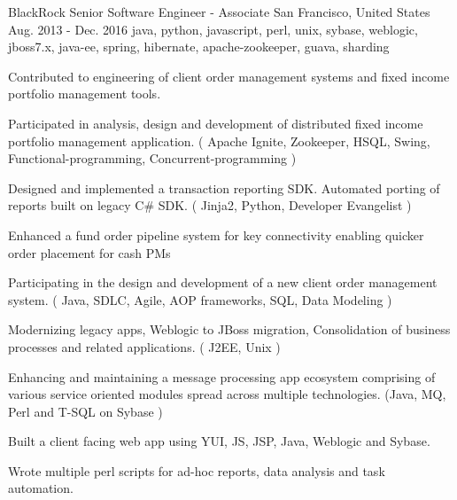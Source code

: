 \cventry
    {BlackRock} %
    {Senior Software Engineer - Associate} %
    {San Francisco, United States} %
    {Aug. 2013 - Dec. 2016} %
    {java, python, javascript, perl, unix, sybase, weblogic, jboss7.x, java-ee, spring, hibernate, apache-zookeeper, guava, sharding}%
    {
        Contributed to engineering of client order management systems and fixed income portfolio management tools.
    \begin{cvitems} %
        \item { Participated in analysis, design and development of distributed fixed income portfolio management application. ( Apache Ignite, Zookeeper, HSQL, Swing, Functional-programming, Concurrent-programming )}
        \item { Designed and implemented a transaction reporting SDK. Automated porting of reports built on legacy C\# SDK. ( Jinja2, Python, Developer Evangelist )}
        \item { Enhanced a fund order pipeline system for key connectivity enabling quicker order placement for cash PMs}
        \item { Participating in the design and development of a new client order management system. ( Java, SDLC, Agile, AOP frameworks, SQL, Data Modeling )}
        \item { Modernizing legacy apps, Weblogic to JBoss migration, Consolidation of business processes and related applications. ( J2EE, Unix )}
        \item { Enhancing and maintaining a message processing app ecosystem comprising of various service oriented modules spread across multiple technologies. (Java, MQ, Perl and T-SQL on Sybase )}
        \item { Built a client facing web app using YUI, JS, JSP, Java, Weblogic and Sybase.}
        \item { Wrote multiple perl scripts for ad-hoc reports, data analysis and task automation.}
    \end{cvitems}
    }